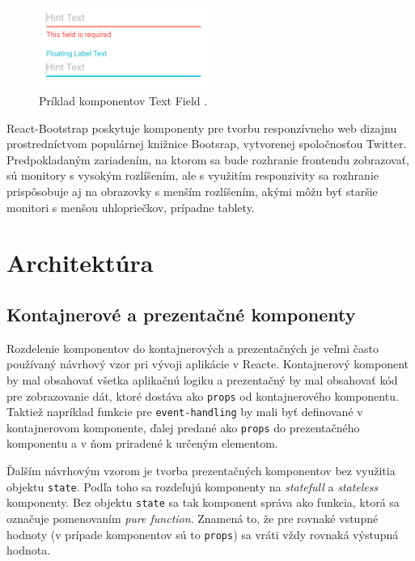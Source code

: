\documentclass[
  digital, %
  table,   %
  lof,     %
  lot,     %
]{fithesis3}
\begin{document}
\begin{figure}
	\begin{center}
	\includegraphics[width=0.5\textwidth]{img/materialui.png}
	\end{center}
    \caption{Príklad komponentov Text Field \parencite{materialui}.}
	\label{fig:materialui}
\end{figure}

React-Bootstrap poskytuje komponenty pre tvorbu responzívneho web dizajnu prostredníctvom populárnej knižnice Bootsrap, vytvorenej spoločnosťou Twitter. Predpokladaným zariadením, na ktorom sa bude rozhranie frontendu zobrazovať, sú monitory s vysokým rozlíšením, ale s využitím responzivity sa rozhranie prispôsobuje aj na obrazovky s menším rozlíšením, akými môžu byť staršie monitori s menšou uhlopriečkov, prípadne tablety.

\section{Architektúra}
\subsection{Kontajnerové a prezentačné komponenty}
Rozdelenie komponentov do kontajnerových a prezentačných je veľmi často používaný návrhový vzor pri vývoji aplikácie v Reacte. Kontajnerový komponent by mal obsahovať všetka aplikačnú logiku a prezentačný by mal obsahovať kód pre zobrazovanie dát, ktoré dostáva ako \texttt{props} od kontajnerového komponentu. Taktiež napríklad funkcie pre \texttt{event-handling} by mali byť definované v kontajnerovom komponente, ďalej predané ako \texttt{props} do prezentačného komponentu a v ňom priradené k určeným elementom.

Ďalším návrhovým vzorom je tvorba prezentačných komponentov bez využitia objektu \texttt{state}. Podľa toho sa rozdeľujú komponenty na \textit{statefull} a \textit{stateless} komponenty. Bez objektu \texttt{state} sa tak komponent správa ako funkcia, ktorá sa označuje pomenovaním \textit{pure function}. Znamená to, že pre rovnaké vstupné hodnoty (v prípade komponentov sú to \texttt{props}) sa vráti vždy rovnaká výstupná hodnota.
\end{document}
